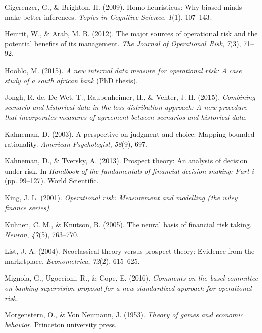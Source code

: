 \documentclass{DissertateUSU}
\begin{document}
\leavevmode\hypertarget{ref-gigerenzer2009homo}{}%
Gigerenzer, G., \& Brighton, H. (2009). Homo heuristicus: Why biased
minds make better inferences. \emph{Topics in Cognitive Science},
\emph{1}(1), 107--143.

\leavevmode\hypertarget{ref-hemrit2012major}{}%
Hemrit, W., \& Arab, M. B. (2012). The major sources of operational risk
and the potential benefits of its management. \emph{The Journal of
Operational Risk}, \emph{7}(3), 71--92.

\leavevmode\hypertarget{ref-hoohlo2015new}{}%
Hoohlo, M. (2015). \emph{A new internal data measure for operational
risk: A case study of a south african bank} (PhD thesis).

\leavevmode\hypertarget{ref-de2015combining}{}%
Jongh, R. de, De Wet, T., Raubenheimer, H., \& Venter, J. H. (2015).
\emph{Combining scenario and historical data in the loss distribution
approach: A new procedure that incorporates measures of agreement
between scenarios and historical data}.

\leavevmode\hypertarget{ref-kahneman2003perspective}{}%
Kahneman, D. (2003). A perspective on judgment and choice: Mapping
bounded rationality. \emph{American Psychologist}, \emph{58}(9), 697.

\leavevmode\hypertarget{ref-kahneman2013prospect}{}%
Kahneman, D., \& Tversky, A. (2013). Prospect theory: An analysis of
decision under risk. In \emph{Handbook of the fundamentals of financial
decision making: Part i} (pp. 99--127). World Scientific.

\leavevmode\hypertarget{ref-king2001operational}{}%
King, J. L. (2001). \emph{Operational risk: Measurement and modelling
(the wiley finance series)}.

\leavevmode\hypertarget{ref-kuhnen2005neural}{}%
Kuhnen, C. M., \& Knutson, B. (2005). The neural basis of financial risk
taking. \emph{Neuron}, \emph{47}(5), 763--770.

\leavevmode\hypertarget{ref-list2004neoclassical}{}%
List, J. A. (2004). Neoclassical theory versus prospect theory: Evidence
from the marketplace. \emph{Econometrica}, \emph{72}(2), 615--625.

\leavevmode\hypertarget{ref-mignola2016comments}{}%
Mignola, G., Ugoccioni, R., \& Cope, E. (2016). \emph{Comments on the
basel committee on banking supervision proposal for a new standardized
approach for operational risk}.

\leavevmode\hypertarget{ref-morgenstern1953theory}{}%
Morgenstern, O., \& Von Neumann, J. (1953). \emph{Theory of games and
economic behavior}. Princeton university press.
\end{document}
